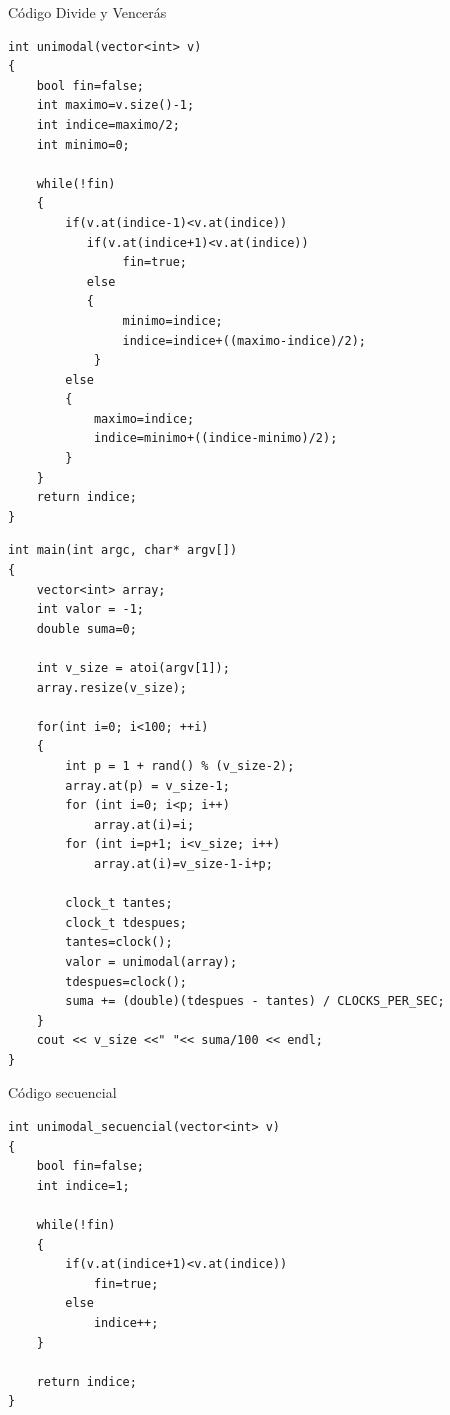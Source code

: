 \documentclass[12pt]{beamer}
\begin{document}
\begin{frame}[fragile]{Código Divide y Vencerás}
	\begin{lstlisting}
int unimodal(vector<int> v)
{
	bool fin=false;
	int maximo=v.size()-1;
	int indice=maximo/2;
	int minimo=0;
 
	while(!fin)
	{
        if(v.at(indice-1)<v.at(indice))
           if(v.at(indice+1)<v.at(indice))
			    fin=true;
		   else
		   {
				minimo=indice;
				indice=indice+((maximo-indice)/2);
			}
		else
		{
			maximo=indice;
			indice=minimo+((indice-minimo)/2);
		}
	}
	return indice;
}
	\end{lstlisting}
\end{frame}
\begin{frame}[fragile]
	\begin{lstlisting}
int main(int argc, char* argv[])
{
	vector<int> array;
  	int valor = -1;
	double suma=0;

	int v_size = atoi(argv[1]);
	array.resize(v_size);

	for(int i=0; i<100; ++i)
	{
		int p = 1 + rand() % (v_size-2);
  		array.at(p) = v_size-1;
  		for (int i=0; i<p; i++)
  			array.at(i)=i;
  		for (int i=p+1; i<v_size; i++)
  			array.at(i)=v_size-1-i+p;

		clock_t tantes;
		clock_t tdespues;
		tantes=clock();
		valor = unimodal(array);
		tdespues=clock();
		suma += (double)(tdespues - tantes) / CLOCKS_PER_SEC;
	}
  	cout << v_size <<" "<< suma/100 << endl;
}
	\end{lstlisting}

\end{frame}

\begin{frame}[fragile]{Código secuencial}
	\begin{lstlisting}
int unimodal_secuencial(vector<int> v)
{
	bool fin=false;
  	int indice=1;

  	while(!fin)
  	{
     	if(v.at(indice+1)<v.at(indice))
      		fin=true;
     	else
      		indice++;
  	}

  	return indice;
}
	\end{lstlisting}
\end{frame}
\end{document}
